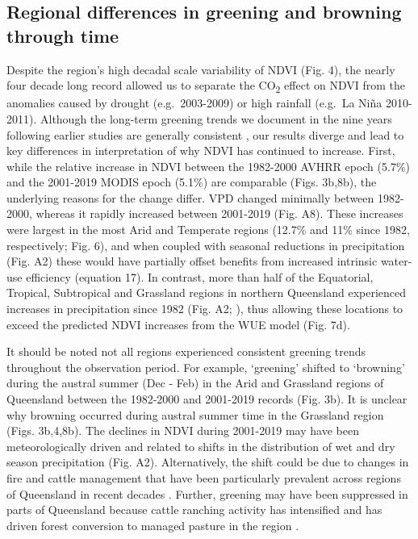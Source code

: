 \documentclass[gc, manuscript]{copernicus}
\begin{document}
\subsection{Regional differences in greening and browning through time}

Despite the region's high decadal scale variability of NDVI (Fig. 4),
the nearly four decade long record allowed us to separate the
CO\textsubscript{2} effect on NDVI from the anomalies caused by drought
(e.g.~2003-2009) or high rainfall (e.g.~La Niña 2010-2011). Although the
long-term greening trends we document in the nine years following
earlier studies are generally consistent
\citep{donohueClimaterelatedTrendsAustralian2009c, ukkolaReducedStreamflowWaterstressed2016b},
our results diverge and lead to key differences in interpretation of why
NDVI has continued to increase. First, while the relative increase in
NDVI between the 1982-2000 AVHRR epoch (5.7\%) and the 2001-2019 MODIS
epoch (5.1\%) are comparable (Figs. 3b,8b), the underlying reasons for
the change differ. VPD changed minimally between 1982-2000, whereas it
rapidly increased between 2001-2019 (Fig. A8). These increases were
largest in the most Arid and Temperate regions (12.7\% and 11\% since
1982, respectively; Fig. 6), and when coupled with seasonal reductions
in precipitation (Fig. A2) these would have partially offset benefits
from increased intrinsic water-use efficiency (equation 17). In
contrast, more than half of the Equatorial, Tropical, Subtropical and
Grassland regions in northern Queensland experienced increases in
precipitation since 1982 (Fig. A2;
\citet{ukkolaExploringStationarityAustralian2019c}), thus allowing these
locations to exceed the predicted NDVI increases from the WUE model
(Fig. 7d).

It should be noted not all regions experienced consistent greening
trends throughout the observation period. For example, `greening'
shifted to `browning' during the austral summer (Dec - Feb) in the Arid
and Grassland regions of Queensland between the 1982-2000 and 2001-2019
records (Fig. 3b). It is unclear why browning occurred during austral
summer time in the Grassland region (Figs. 3b,4,8b). The declines in
NDVI during 2001-2019 may have been meteorologically driven and related
to shifts in the distribution of wet and dry season precipitation (Fig.
A2). Alternatively, the shift could be due to changes in fire and cattle
management that have been particularly prevalent across regions of
Queensland in recent decades \citep{seabrookCattleCropsClearing2006}.
Further, greening may have been suppressed in parts of Queensland
because cattle ranching activity has intensified and has driven forest
conversion to managed pasture in the region
\citep{mcalpineIncreasingWorldConsumption2009}.
\end{document}
